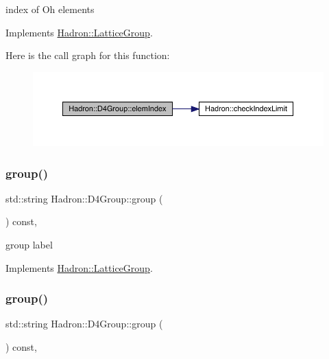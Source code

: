 index of Oh elements 

Implements \mbox{\hyperlink{structHadron_1_1LatticeGroup_afb8e3ee60de059f75bce1044c694e1e8}{Hadron\+::\+Lattice\+Group}}.

Here is the call graph for this function\+:
\nopagebreak
\begin{figure}[H]
\begin{center}
\leavevmode
\includegraphics[width=350pt]{de/d5e/structHadron_1_1D4Group_aa4ca8a3f1bc6774b630cd6a354179298_cgraph}
\end{center}
\end{figure}
\mbox{\label{structHadron_1_1D4Group_ae6c08a58023532bcf277f60c1dddde4f}} 
\subsubsection{\texorpdfstring{group()}{group()}\hspace{0.1cm}{\footnotesize\ttfamily [1/2]}}
{\footnotesize\ttfamily std\+::string Hadron\+::\+D4\+Group\+::group (\begin{DoxyParamCaption}{ }\end{DoxyParamCaption}) const\hspace{0.3cm}{\ttfamily [inline]}, {\ttfamily [virtual]}}

group label 

Implements \mbox{\hyperlink{structHadron_1_1LatticeGroup_a82208a322bf1b1db489f16af38e70087}{Hadron\+::\+Lattice\+Group}}.

\mbox{\label{structHadron_1_1D4Group_ae6c08a58023532bcf277f60c1dddde4f}} 
\subsubsection{\texorpdfstring{group()}{group()}\hspace{0.1cm}{\footnotesize\ttfamily [2/2]}}
{\footnotesize\ttfamily std\+::string Hadron\+::\+D4\+Group\+::group (\begin{DoxyParamCaption}{ }\end{DoxyParamCaption}) const\hspace{0.3cm}{\ttfamily [inline]}, {\ttfamily [virtual]}}

